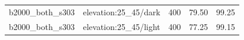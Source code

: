 \begin{longtable}{l>{\raggedright\arraybackslash}p{.42\linewidth}rrr}
b2000\_\allowbreak{}both\_\allowbreak{}s303 & %
elevation:25\_\allowbreak{}45/dark & %
400 & %
79.50 & %
99.25 \\ %

b2000\_\allowbreak{}both\_\allowbreak{}s303 & %
elevation:25\_\allowbreak{}45/light & %
400 & %
77.25 & %
99.15 \\ %


\end{longtable}
